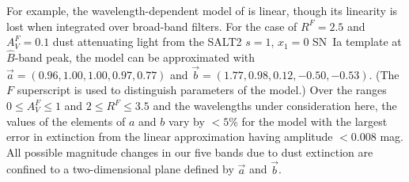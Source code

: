 \documentclass[trackchanges]{aastex62}   	%
\begin{document}
For example,   the wavelength-dependent model of  \citet{1989ApJ...345..245C} is linear,
though its linearity is lost when integrated over broad-band filters.
For the case of
$R^F=2.5$ and $A^F_V=0.1$ dust attenuating light from the SALT2
\citep{2007A&A...466...11G} $s=1$, $x_1=0$ SN~Ia template at ${\hat{B}}$-band peak, the 
 model
can be approximated with
$\vec{a} = (0.96,   1.00,   1.00,   0.97,   0.77)$ and $\vec{b}=(  1.77,   0.98,   0.12,  -0.50,  -0.53)$.
(The $F$ superscript is used to distinguish parameters of the  model.)
Over the ranges
 $0\le A^F_V\le 1$ and $2 \le R^F \le 3.5$ 
and the wavelengths under consideration here,  the values of the elements of $a$ and $b$ vary by $<5$\%
for the
 model with
 the largest error in extinction from the linear approximation having amplitude $<0.008$ mag.
All possible magnitude changes in our five bands due to    dust extinction are confined to a two-dimensional
plane defined by $\vec{a}$ and  $\vec{b}$. 
\end{document}
